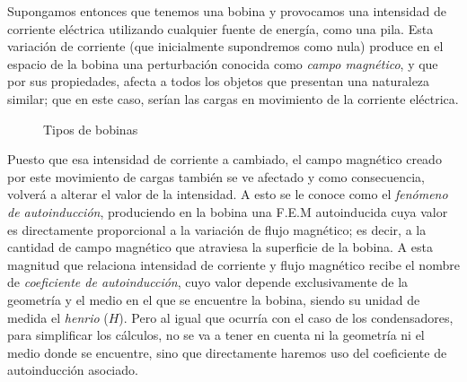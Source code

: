 \documentclass[../main.tex]{subfiles}
\begin{document}
Supongamos entonces que tenemos una bobina y provocamos una intensidad de corriente eléctrica utilizando cualquier fuente de energía, como una pila. Esta variación de corriente (que inicialmente supondremos como nula) produce en el espacio de la bobina una perturbación conocida como \textit{campo magnético}, y que por sus propiedades, afecta a todos los objetos que presentan una naturaleza similar; que en este caso, serían las cargas en movimiento de la corriente eléctrica. \\

\begin{figure}[!h]
    \centering
    \caption{Tipos de bobinas}
    \label{fig::tipos_bobinas}
\end{figure}

Puesto que esa intensidad de corriente a cambiado, el campo magnético creado por este movimiento de cargas también se ve afectado y como consecuencia, volverá a alterar el valor de la intensidad. A esto se le conoce como el \textit{fenómeno de autoinducción}, produciendo en la bobina una F.E.M autoinducida cuya valor es directamente proporcional a la variación de flujo magnético; es decir, a la cantidad de campo magnético que atraviesa la superficie de la bobina. A esta magnitud que relaciona intensidad de corriente y flujo magnético recibe el nombre de \textit{coeficiente de autoinducción}, cuyo valor depende exclusivamente de la geometría y el medio en el que se encuentre la bobina, siendo su unidad de medida el \textit{henrio} ($H$). Pero al igual que ocurría con el caso de los condensadores, para simplificar los cálculos, no se va a tener en cuenta ni la geometría ni el medio donde se encuentre, sino que directamente haremos uso del coeficiente de autoinducción asociado. \\ 
\end{document}
